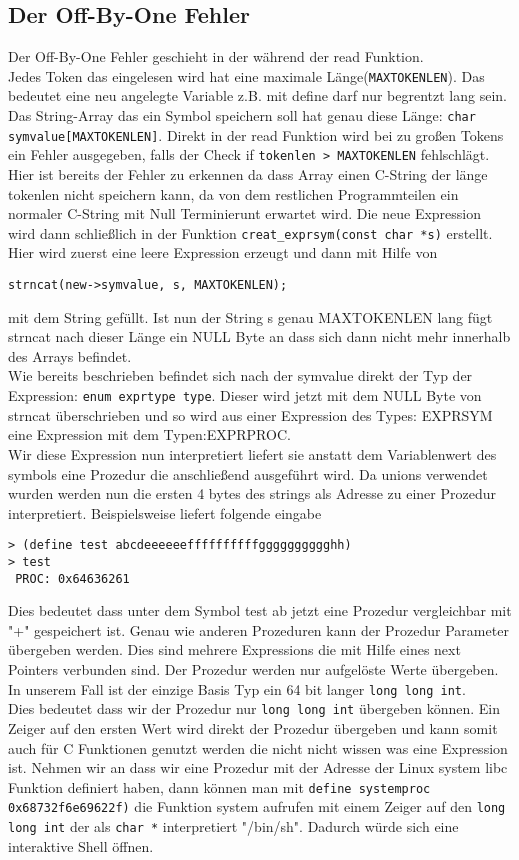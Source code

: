 \subsection{Der Off-By-One Fehler}
\label{luecke}
Der Off-By-One Fehler geschieht in der während der read Funktion.\\
 Jedes Token das eingelesen wird hat eine maximale Länge(\texttt{MAXTOKENLEN}). Das bedeutet eine neu angelegte Variable z.B. mit define darf nur begrentzt lang sein.
Das String-Array das ein Symbol speichern soll hat genau diese Länge: \texttt{char symvalue[MAXTOKENLEN]}. Direkt in der read Funktion wird bei zu großen Tokens ein Fehler ausgegeben, falls der Check if \texttt{tokenlen > MAXTOKENLEN} fehlschlägt. Hier ist bereits der Fehler zu erkennen da dass Array einen C-String der länge tokenlen nicht speichern kann, da von dem restlichen Programmteilen ein normaler C-String mit Null Terminierunt erwartet wird. 
Die neue Expression wird dann schließlich in der Funktion \texttt{creat\_exprsym(const char *s)} erstellt. Hier wird zuerst eine leere Expression erzeugt und dann mit Hilfe von 
\begin{lstlisting} 
strncat(new->symvalue, s, MAXTOKENLEN);
\end{lstlisting} mit dem String gefüllt. Ist nun der String s genau MAXTOKENLEN lang fügt strncat nach dieser Länge ein NULL Byte an dass sich dann nicht mehr innerhalb des Arrays befindet. \\
Wie bereits beschrieben befindet sich nach der symvalue direkt der Typ der Expression: \texttt{enum exprtype type}. Dieser wird jetzt mit dem NULL Byte von strncat überschrieben und so wird aus einer Expression des Types: EXPRSYM eine Expression mit dem Typen:EXPRPROC.\\
Wir diese Expression nun interpretiert liefert sie anstatt dem Variablenwert des symbols eine Prozedur die anschließend ausgeführt wird. Da unions verwendet wurden werden nun die ersten 4 bytes des strings als Adresse zu einer Prozedur interpretiert.
Beispielsweise liefert folgende eingabe
\begin{lstlisting}
> (define test abcdeeeeeeffffffffffgggggggggghh)
> test
 PROC: 0x64636261 
\end{lstlisting}
Dies bedeutet dass unter dem Symbol test ab jetzt eine Prozedur vergleichbar mit "+" gespeichert ist. Genau wie anderen Prozeduren kann der Prozedur Parameter übergeben werden. Dies sind mehrere Expressions die mit Hilfe eines next Pointers verbunden sind. Der Prozedur werden nur aufgelöste Werte übergeben. In unserem Fall ist der einzige Basis Typ ein 64 bit langer \texttt{long long int}. \\
Dies bedeutet dass wir der Prozedur nur \texttt{long long int} übergeben können. Ein Zeiger auf den ersten Wert wird direkt der Prozedur übergeben und kann somit auch für C Funktionen genutzt werden die nicht nicht wissen was eine Expression ist. Nehmen wir an dass wir eine Prozedur mit der Adresse der Linux system libc Funktion definiert haben, dann können man mit \texttt{define systemproc 0x68732f6e69622f)} die Funktion system aufrufen mit einem Zeiger auf den \texttt{long long int} der als \texttt{char *} interpretiert "/bin/sh". Dadurch würde sich eine interaktive Shell öffnen.
